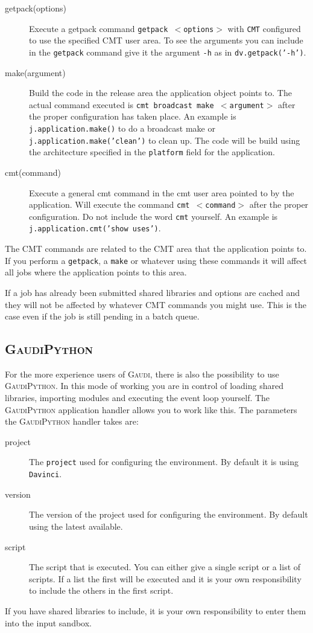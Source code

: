 \documentclass{howto}
\def\gaudi {\textsc{Gaudi}\xspace}
\def\gaudipython {\textsc{GaudiPython}\xspace}
\begin{document}
\begin{description}
\item[getpack(options)] Execute a getpack command \texttt{getpack
    $<$options$>$} with \texttt{CMT} configured to use the specified CMT user
  area. To see the arguments you can include in the \texttt{getpack} command
  give it the argument \texttt{-h} as in \texttt{dv.getpack('-h')}.
\item[make(argument)] Build the code in the release area the application
  object points to. The actual command executed is \texttt{cmt broadcast make
    $<$argument$>$} after the proper configuration has taken place. An example
  is \texttt{j.application.make()} to do a broadcast make or
  \texttt{j.application.make('clean')} to clean up. The code will be build
  using the architecture specified in the \texttt{platform} field for the
  application.
\item[cmt(command)] Execute a general cmt command in the cmt user area pointed
  to by the application. Will execute the command \texttt{cmt $<$command$>$}
  after the proper configuration. Do not include the word \texttt{cmt}
  yourself. An example is \texttt{j.application.cmt('show uses')}.
\end{description}

The CMT commands are related to the CMT area that the application points to.
If you perform a \texttt{getpack}, a \texttt{make} or whatever using these
commands it will affect all jobs where the application points to this area.

\begin{notice}
  If a job has already been submitted shared libraries and options are cached
  and they will not be affected by whatever CMT commands you might use. This
  is the case even if the job is still pending in a batch queue.
\end{notice}

\subsection{\gaudipython}
For the more experience users of \gaudi, there is also the possibility to use
\gaudipython. In this mode of working you are in control of loading shared
libraries, importing modules and executing the event loop yourself. The
\gaudipython application handler allows you to work like this. The parameters
the \gaudipython handler takes are:
\begin{description}
\item[project] The \texttt{project} used for configuring the environment. By
  default it is using \texttt{Davinci}.
\item[version] The version of the project used for configuring the
  environment. By default using the latest available.
\item[script] The script that is executed. You can either give a single script
  or a list of scripts. If a list the first will be executed and it is your
  own responsibility to include the others in the first script.
\end{description}
If you have shared libraries to include, it is your own responsibility to
enter them into the input sandbox.
\end{document}
